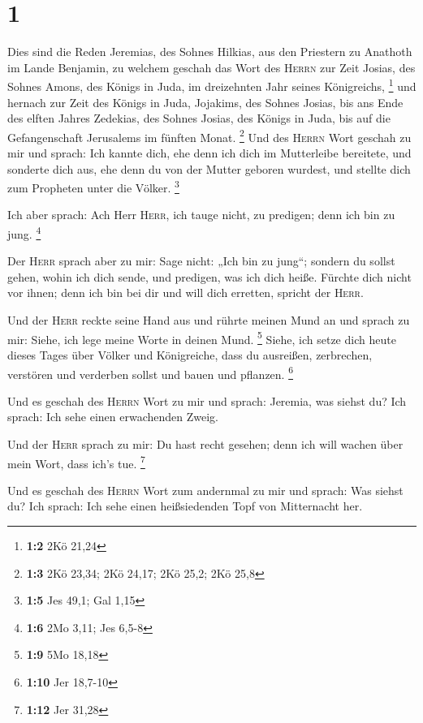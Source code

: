 \hypertarget{section}{%
\section{1}\label{section}}

 Dies sind die Reden Jeremias, des Sohnes Hilkias, aus den
Priestern zu Anathoth im Lande Benjamin,  zu welchem
geschah das Wort des \textsc{Herrn} zur Zeit Josias, des Sohnes Amons,
des Königs in Juda, im dreizehnten Jahr seines Königreichs, \footnote{\textbf{1:2}
  2Kö 21,24}  und hernach zur Zeit des Königs in Juda,
Jojakims, des Sohnes Josias, bis ans Ende des elften Jahres Zedekias,
des Sohnes Josias, des Königs in Juda, bis auf die Gefangenschaft
Jerusalems im fünften Monat. \footnote{\textbf{1:3} 2Kö 23,34; 2Kö
  24,17; 2Kö 25,2; 2Kö 25,8}  Und des \textsc{Herrn} Wort
geschah zu mir und sprach:  Ich kannte dich, ehe denn ich
dich im Mutterleibe bereitete, und sonderte dich aus, ehe denn du von
der Mutter geboren wurdest, und stellte dich zum Propheten unter die
Völker. \footnote{\textbf{1:5} Jes 49,1; Gal 1,15}

 Ich aber sprach: Ach Herr \textsc{Herr}, ich tauge nicht,
zu predigen; denn ich bin zu jung. \footnote{\textbf{1:6} 2Mo 3,11; Jes
  6,5-8}

 Der \textsc{Herr} sprach aber zu mir: Sage nicht: „Ich
bin zu jung``; sondern du sollst gehen, wohin ich dich sende, und
predigen, was ich dich heiße.  Fürchte dich nicht vor
ihnen; denn ich bin bei dir und will dich erretten, spricht der
\textsc{Herr}.

 Und der \textsc{Herr} reckte seine Hand aus und rührte
meinen Mund an und sprach zu mir: Siehe, ich lege meine Worte in deinen
Mund. \footnote{\textbf{1:9} 5Mo 18,18}  Siehe, ich setze
dich heute dieses Tages über Völker und Königreiche, dass du ausreißen,
zerbrechen, verstören und verderben sollst und bauen und pflanzen.
\footnote{\textbf{1:10} Jer 18,7-10}

 Und es geschah des \textsc{Herrn} Wort zu mir und
sprach: Jeremia, was siehst du? Ich sprach: Ich sehe einen erwachenden
Zweig.

 Und der \textsc{Herr} sprach zu mir: Du hast recht
gesehen; denn ich will wachen über mein Wort, dass ich's tue.
\footnote{\textbf{1:12} Jer 31,28}

 Und es geschah des \textsc{Herrn} Wort zum andernmal zu
mir und sprach: Was siehst du? Ich sprach: Ich sehe einen heißsiedenden
Topf von Mitternacht her.

